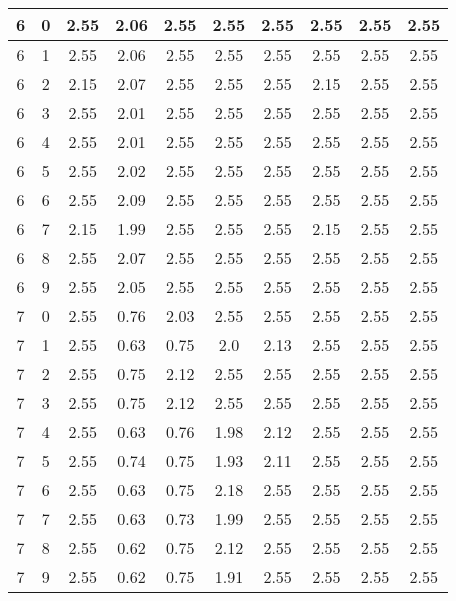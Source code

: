 \begin{longtable}{|c|c||c||c|c|c|c||c|c|c|}
	6 & 0 & 2.55 & 2.06 & 2.55 & 2.55 & 2.55 & 2.55 & 2.55 & 2.55 \\ \hline
	6 & 1 & 2.55 & 2.06 & 2.55 & 2.55 & 2.55 & 2.55 & 2.55 & 2.55 \\ \hline
	6 & 2 & 2.15 & 2.07 & 2.55 & 2.55 & 2.55 & 2.15 & 2.55 & 2.55 \\ \hline
	6 & 3 & 2.55 & 2.01 & 2.55 & 2.55 & 2.55 & 2.55 & 2.55 & 2.55 \\ \hline
	6 & 4 & 2.55 & 2.01 & 2.55 & 2.55 & 2.55 & 2.55 & 2.55 & 2.55 \\ \hline
	6 & 5 & 2.55 & 2.02 & 2.55 & 2.55 & 2.55 & 2.55 & 2.55 & 2.55 \\ \hline
	6 & 6 & 2.55 & 2.09 & 2.55 & 2.55 & 2.55 & 2.55 & 2.55 & 2.55 \\ \hline
	6 & 7 & 2.15 & 1.99 & 2.55 & 2.55 & 2.55 & 2.15 & 2.55 & 2.55 \\ \hline
	6 & 8 & 2.55 & 2.07 & 2.55 & 2.55 & 2.55 & 2.55 & 2.55 & 2.55 \\ \hline
	6 & 9 & 2.55 & 2.05 & 2.55 & 2.55 & 2.55 & 2.55 & 2.55 & 2.55 \\ \hline
	7 & 0 & 2.55 & 0.76 & 2.03 & 2.55 & 2.55 & 2.55 & 2.55 & 2.55 \\ \hline
	7 & 1 & 2.55 & 0.63 & 0.75 & 2.0 & 2.13 & 2.55 & 2.55 & 2.55 \\ \hline
	7 & 2 & 2.55 & 0.75 & 2.12 & 2.55 & 2.55 & 2.55 & 2.55 & 2.55 \\ \hline
	7 & 3 & 2.55 & 0.75 & 2.12 & 2.55 & 2.55 & 2.55 & 2.55 & 2.55 \\ \hline
	7 & 4 & 2.55 & 0.63 & 0.76 & 1.98 & 2.12 & 2.55 & 2.55 & 2.55 \\ \hline
	7 & 5 & 2.55 & 0.74 & 0.75 & 1.93 & 2.11 & 2.55 & 2.55 & 2.55 \\ \hline
	7 & 6 & 2.55 & 0.63 & 0.75 & 2.18 & 2.55 & 2.55 & 2.55 & 2.55 \\ \hline
	7 & 7 & 2.55 & 0.63 & 0.73 & 1.99 & 2.55 & 2.55 & 2.55 & 2.55 \\ \hline
	7 & 8 & 2.55 & 0.62 & 0.75 & 2.12 & 2.55 & 2.55 & 2.55 & 2.55 \\ \hline
	7 & 9 & 2.55 & 0.62 & 0.75 & 1.91 & 2.55 & 2.55 & 2.55 & 2.55 \\ \hline
\end{longtable}
\clearpage{}

